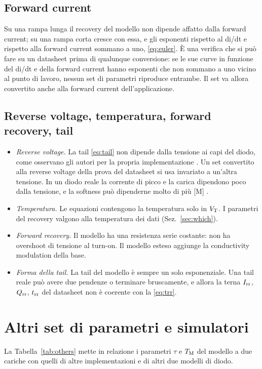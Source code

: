 \documentclass[10pt,a4paper]{scrartcl}
\let\newcommand\pdvaluedefine
\newcommand{\Irr}{I_\mathrm{rr}}
\newcommand{\Qrr}{Q_\mathrm{rr}}
\newcommand{\trr}{t_\mathrm{rr}}
\newcommand{\TM}{T_\mathrm{M}}
\newcommand{\VT}{V_\mathrm{T}}
\begin{document}
\subsection{Forward current}
Su una rampa lunga il recovery del modello non dipende affatto dalla forward current; su una rampa corta cresce con essa, e gli esponenti rispetto al di/dt e rispetto alla forward current sommano a uno, \eqref{eq:euler}. È una verifica che si può fare su un datasheet prima di qualunque conversione: se le sue curve in funzione del di/dt e della forward current hanno esponenti che non sommano a uno vicino al punto di lavoro, nessun set di parametri riproduce entrambe. Il set va allora convertito anche alla forward current dell'applicazione.

\subsection{Reverse voltage, temperatura, forward recovery, tail}
\label{sec:otherlimits}
\begin{itemize}
\item \emph{Reverse voltage.} La tail \eqref{eq:tail} non dipende dalla tensione ai capi del diodo, come osservano gli autori per la propria implementazione \cite{pemodels}. Un set convertito alla reverse voltage della prova del datasheet si usa invariato a un'altra tensione. In un diodo reale la corrente di picco e la carica dipendono poco dalla tensione, e la softness può dipenderne molto di più [M] \cite{lutz}.
\item \emph{Temperatura.} Le equazioni contengono la temperatura solo in $\VT$. I parametri del recovery valgono alla temperatura dei dati (Sez.~\ref{sec:which}).
\item \emph{Forward recovery.} Il modello ha una resistenza serie costante: non ha overshoot di tensione al turn-on. Il modello esteso \cite{ma1993} aggiunge la conductivity modulation della base.
\item \emph{Forma della tail.} La tail del modello è sempre un solo esponenziale. Una tail reale può avere due pendenze o terminare bruscamente, e allora la terna $\Irr$, $\Qrr$, $\trr$ del datasheet non è coerente con la \eqref{eq:trr}.
\end{itemize}

\section{Altri set di parametri e simulatori}
\label{sec:others}
La Tabella~\ref{tab:others} mette in relazione i parametri $\tau$ e $\TM$ del modello a due cariche con quelli di altre implementazioni e di altri due modelli di diodo.
\end{document}
